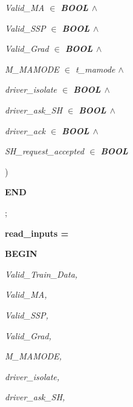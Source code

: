 \documentclass[11pt]{article}
\begin{document}
\begin{sloppypar}
\hspace*{0.60in}\it Valid\_MA  $\in$  \bf BOOL  $\land$ 

\hspace*{0.60in}\it Valid\_SSP  $\in$  \bf BOOL  $\land$ 

\hspace*{0.60in}\it Valid\_Grad  $\in$ \hspace*{0.10in}\bf BOOL  $\land$ 

\hspace*{0.60in}\it M\_MAMODE  $\in$ \hspace*{0.10in}\it t\_mamode  $\land$ 

\hspace*{0.60in}\it driver\_isolate  $\in$  \bf BOOL  $\land$ 

\hspace*{0.60in}\it driver\_ask\_SH  $\in$  \bf BOOL  $\land$ 

\hspace*{0.60in}\it driver\_ack  $\in$  \bf BOOL  $\land$ 

\hspace*{0.60in}\it SH\_request\_accepted  $\in$  \bf BOOL

\hspace*{0.40in}\rm )

\hspace*{0.20in}\bf END

\hspace*{0.20in}\rm ; 

\hspace*{0.20in}

\hspace*{0.20in}\bf read\_inputs \rm =

\hspace*{0.20in}\bf BEGIN

\hspace*{0.40in}\it Valid\_Train\_Data\rm ,

\hspace*{0.40in}\it Valid\_MA\rm ,

\hspace*{0.40in}\it Valid\_SSP\rm ,

\hspace*{0.40in}\it Valid\_Grad\rm ,

\hspace*{0.40in}\it M\_MAMODE\rm ,

\hspace*{0.40in}\it driver\_isolate\rm ,

\hspace*{0.40in}\it driver\_ask\_SH\rm ,


\end{sloppypar}
\end{document}
